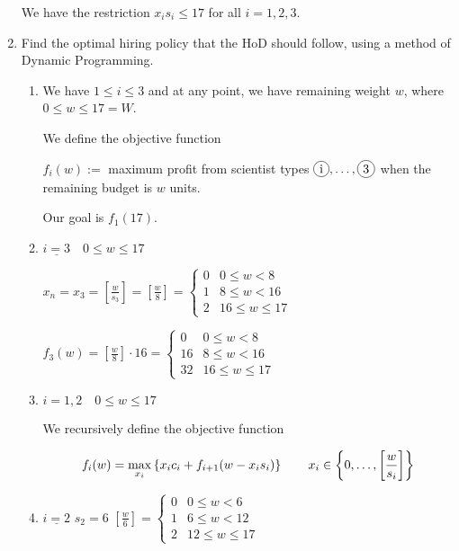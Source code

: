 \begin{prob}
\begin{enumerate}[label = {\textbf{(\greek*)}}]
\begin{sol}
We have the restriction $x_i s_i \leq 17$ for all $i=1,2,3$.


\end{sol}
    \item Find the optimal hiring policy that the HoD should follow, using a method of Dynamic Programming.
    
    \begin{sol}
\begin{enumerate}[start = 1, label = {\protect\tsc{$\mathbf{S_{\arabic*}}$}}]
\item We have $1\leq i\leq 3$ and at any point, we have remaining weight $w$, where $0\leq w \leq 17=W$.

We define the objective function

$f_i(w):=$ maximum profit from scientist types $\tc{i},\dots,\tc{3}$ when the remaining budget is $w$ units.

Our goal is $f_1(17)$.

\item $\underline{i=3}\quad 0\leq w\leq 17$

$x_n=x_3=\left[\frac{w}{s_3}\right]=\left[\frac{w}{8}\right] = \begin{cases} 
0 & 0\leq w < 8 \\ 1 & 8\leq w < 16 \\ 2 & 16 \leq w \leq 17
\end{cases}$

$f_3(w)=\left[\frac{w}{8}\right]\cdot 16 = \begin{cases} 
0 & 0\leq w < 8 \\ 16 & 8\leq w < 16 \\ 32 & 16 \leq w \leq 17
\end{cases}$

\item $i=1,2\quad 0\leq w\leq 17$

We recursively define the objective function

$$f_i(w)=\max\limits_{x_i} \left\{x_ic_i + f_{i+1}(w-x_is_i)\right\}\qquad x_i\in \left\{0,\dots,\left[\frac{w}{s_i}\right]\right\}$$
   
\item $\underline{i=2}$ \imp $s_2=6$ \imp $\left[\frac{w}{6}\right] = \begin{cases} 
0 & 0\leq w < 6 \\ 1 & 6\leq w < 12 \\ 2 & 12 \leq w \leq 17
\end{cases}$


\end{enumerate}
\end{sol}
\end{enumerate}
\end{prob}
